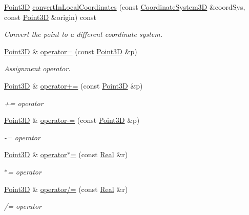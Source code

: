 \begin{DoxyCompactItemize}
\hyperlink{classFVCode3D_1_1Point3D}{Point3D} \hyperlink{classFVCode3D_1_1Point3D_a7099d16176cfc75deff3b5a6d8bf4c24}{convert\+In\+Local\+Coordinates} (const \hyperlink{classFVCode3D_1_1CoordinateSystem3D}{Coordinate\+System3D} \&coord\+Sys, const \hyperlink{classFVCode3D_1_1Point3D}{Point3D} \&origin) const 
\begin{DoxyCompactList}\small\item\em Convert the point to a different coordinate system. \end{DoxyCompactList}\item 
\hyperlink{classFVCode3D_1_1Point3D}{Point3D} \& \hyperlink{classFVCode3D_1_1Point3D_a94bf902b79e445db8f54846d35d59018}{operator=} (const \hyperlink{classFVCode3D_1_1Point3D}{Point3D} \&p)
\begin{DoxyCompactList}\small\item\em Assignment operator. \end{DoxyCompactList}\item 
\hyperlink{classFVCode3D_1_1Point3D}{Point3D} \& \hyperlink{classFVCode3D_1_1Point3D_a30dfdd9a0df466233b6d82798a7770a1}{operator+=} (const \hyperlink{classFVCode3D_1_1Point3D}{Point3D} \&p)
\begin{DoxyCompactList}\small\item\em += operator \end{DoxyCompactList}\item 
\hyperlink{classFVCode3D_1_1Point3D}{Point3D} \& \hyperlink{classFVCode3D_1_1Point3D_a22a46a2c737e9a494f3d13b8e2e5f37f}{operator-\/=} (const \hyperlink{classFVCode3D_1_1Point3D}{Point3D} \&p)
\begin{DoxyCompactList}\small\item\em -\/= operator \end{DoxyCompactList}\item 
\hyperlink{classFVCode3D_1_1Point3D}{Point3D} \& \hyperlink{classFVCode3D_1_1Point3D_a3e9b71f50ab0b9e52a3bc5ace577bbb7}{operator$\ast$=} (const \hyperlink{namespaceFVCode3D_a40c1f5588a248569d80aa5f867080e83}{Real} \&r)
\begin{DoxyCompactList}\small\item\em $\ast$= operator \end{DoxyCompactList}\item 
\hyperlink{classFVCode3D_1_1Point3D}{Point3D} \& \hyperlink{classFVCode3D_1_1Point3D_a559b58149768e633607a90b765d86883}{operator/=} (const \hyperlink{namespaceFVCode3D_a40c1f5588a248569d80aa5f867080e83}{Real} \&r)
\begin{DoxyCompactList}\small\item\em /= operator \end{DoxyCompactList}\item 

\end{DoxyCompactItemize}
